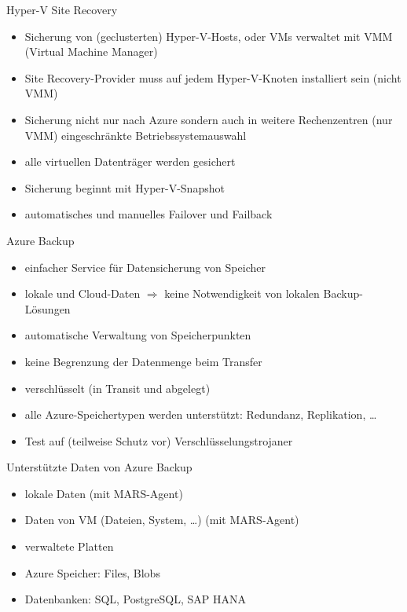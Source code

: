 \begin{flashcard}[Definition]{Hyper-V Site Recovery}
  \begin{itemize}
    \item Sicherung von (geclusterten) Hyper-V-Hosts,\newline
      oder VMs verwaltet mit VMM (Virtual Machine Manager)
    \item Site Recovery-Provider muss auf jedem Hyper-V-Knoten installiert sein (nicht VMM)
    \item Sicherung nicht nur nach Azure sondern auch in weitere Rechenzentren (nur VMM)\newline
      eingeschränkte Betriebssystemauswahl
    \item alle virtuellen Datenträger werden gesichert
    \item Sicherung beginnt mit Hyper-V-Snapshot
    \item automatisches und manuelles Failover und Failback
  \end{itemize}
\end{flashcard}

\begin{flashcard}[Definition]{Azure Backup}
  \begin{itemize}
    \item einfacher Service für Datensicherung von Speicher
    \item lokale und Cloud-Daten\newline
      $\Rightarrow$ keine Notwendigkeit von lokalen Backup-Lösungen
    \item automatische Verwaltung von Speicherpunkten
    \item keine Begrenzung der Datenmenge beim Transfer
    \item verschlüsselt (in Transit und abgelegt)
    \item alle Azure-Speichertypen werden unterstützt: Redundanz, Replikation, \ldots
    \item Test auf (teilweise Schutz vor) Verschlüsselungstrojaner
  \end{itemize}
\end{flashcard}

\begin{flashcard}[Definition]{Unterstützte Daten von Azure Backup}
  \begin{itemize}
    \item lokale Daten (mit MARS-Agent)
    \item Daten von VM (Dateien, System, \ldots) (mit MARS-Agent)
    \item verwaltete Platten
    \item Azure Speicher: Files, Blobs
    \item Datenbanken: SQL, PostgreSQL, SAP HANA
  \end{itemize}
\end{flashcard}

